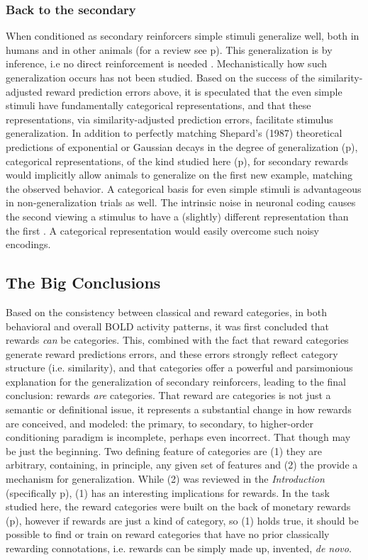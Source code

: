 \subsubsection{Back to the secondary}
\label{sub:generalsense}
When conditioned as secondary reinforcers simple stimuli generalize well, both in humans and in other animals (for a review see p\pageref{subsub:birds}).  This generalization is by inference, i.e no direct reinforcement is needed \cite{Guttman:1956p8355,Nakamura:2006p9093,Smith:2011p9101}.  Mechanistically how such generalization occurs has not been studied.  Based on the success of the similarity-adjusted reward prediction errors above, it is speculated that the even simple stimuli have fundamentally categorical representations, and that these representations, via similarity-adjusted prediction errors, facilitate stimulus generalization.  In addition to perfectly matching Shepard's (1987) theoretical predictions of exponential or Gaussian decays in the degree of generalization (p\pageref{subsub:curves}), categorical representations, of the kind studied here (p\pageref{subsub:catquant}), for secondary rewards would implicitly allow animals to generalize on the first new example, matching the observed behavior.  A categorical basis for even simple stimuli is advantageous in non-generalization trials as well. The intrinsic noise in neuronal coding causes the second viewing a stimulus to have a (slightly) different representation than the first \cite{Ashby:1986p9783}.  A categorical representation would easily overcome such noisy encodings. 

\subsection{The Big Conclusions}
Based on the consistency between classical and reward categories, in both behavioral and overall BOLD activity patterns, it was first concluded that rewards \emph{can} be categories.  This, combined with the fact that reward categories generate reward predictions errors, and these errors strongly reflect category structure (i.e. similarity), and that categories offer a powerful and parsimonious explanation for the generalization of secondary reinforcers, leading to the final conclusion: rewards \emph{are} categories.
That reward are categories is not just a semantic or definitional issue, it represents a substantial change in how rewards are conceived, and modeled: the primary, to secondary, to higher-order conditioning paradigm is incomplete, perhaps even incorrect.  That though may be just the beginning.  Two defining feature of categories are (1) they are arbitrary, containing, in principle, any given set of features and (2) the provide a mechanism for generalization.  While (2) was reviewed in the \emph{Introduction} (specifically p\pageref{sub:gen}), (1) has an interesting implications for rewards.  In the task studied here, the reward categories were built on the back of monetary rewards (p\pageref{subsub:whatwhen}), however if rewards are just a kind of category, so (1) holds true, it should be possible to find or train on reward categories that have no prior classically rewarding connotations, i.e. rewards can be simply made up, invented, \emph{de novo}.

